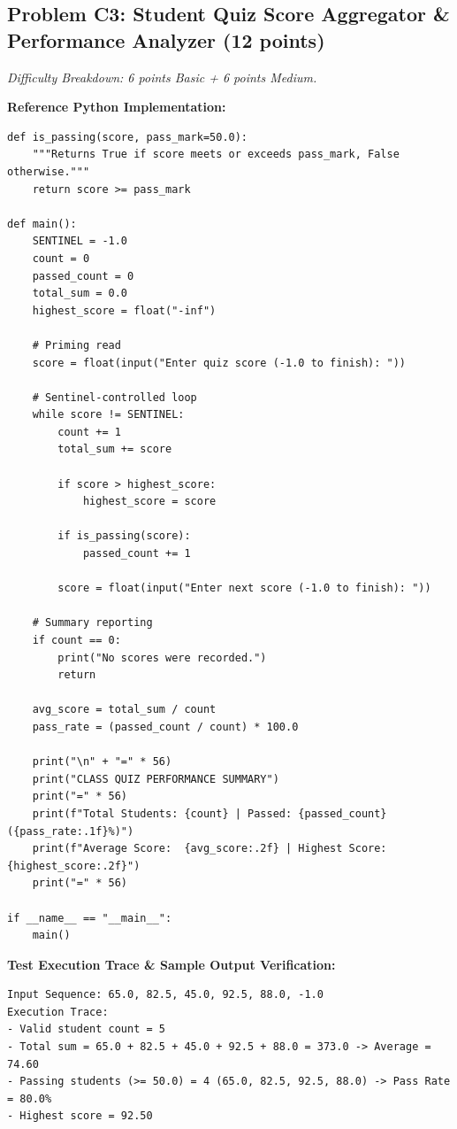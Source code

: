 \documentclass[11pt,a4paper]{article}
\begin{document}
\newpage

\subsection*{Problem C3: Student Quiz Score Aggregator \& Performance Analyzer (12 points)}
\textit{Difficulty Breakdown: 6 points Basic + 6 points Medium.}

\textbf{Reference Python Implementation:}
\begin{lstlisting}
def is_passing(score, pass_mark=50.0):
    """Returns True if score meets or exceeds pass_mark, False otherwise."""
    return score >= pass_mark

def main():
    SENTINEL = -1.0
    count = 0
    passed_count = 0
    total_sum = 0.0
    highest_score = float("-inf")
    
    # Priming read
    score = float(input("Enter quiz score (-1.0 to finish): "))
    
    # Sentinel-controlled loop
    while score != SENTINEL:
        count += 1
        total_sum += score
        
        if score > highest_score:
            highest_score = score
            
        if is_passing(score):
            passed_count += 1
            
        score = float(input("Enter next score (-1.0 to finish): "))
        
    # Summary reporting
    if count == 0:
        print("No scores were recorded.")
        return
        
    avg_score = total_sum / count
    pass_rate = (passed_count / count) * 100.0
    
    print("\n" + "=" * 56)
    print("CLASS QUIZ PERFORMANCE SUMMARY")
    print("=" * 56)
    print(f"Total Students: {count} | Passed: {passed_count} ({pass_rate:.1f}%)")
    print(f"Average Score:  {avg_score:.2f} | Highest Score: {highest_score:.2f}")
    print("=" * 56)

if __name__ == "__main__":
    main()
\end{lstlisting}

\vspace{0.4mm}
\textbf{Test Execution Trace \& Sample Output Verification:}
\begin{lstlisting}[basicstyle=\ttfamily\scriptsize]
Input Sequence: 65.0, 82.5, 45.0, 92.5, 88.0, -1.0
Execution Trace:
- Valid student count = 5
- Total sum = 65.0 + 82.5 + 45.0 + 92.5 + 88.0 = 373.0 -> Average = 74.60
- Passing students (>= 50.0) = 4 (65.0, 82.5, 92.5, 88.0) -> Pass Rate = 80.0%
- Highest score = 92.50
\end{lstlisting}
\end{document}
